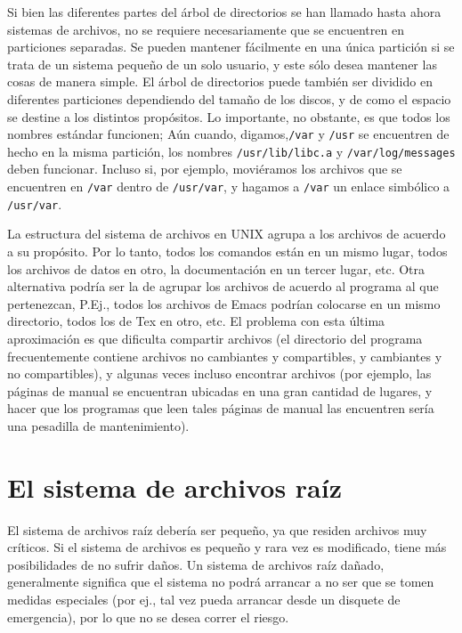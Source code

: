 Si bien las diferentes partes del árbol de directorios se han
llamado hasta ahora sistemas de archivos, no se requiere necesariamente que se
encuentren en particiones separadas. Se pueden mantener fácilmente en una única
partición si se trata de un sistema pequeño de un solo usuario, y este sólo
desea mantener las cosas de manera simple. El árbol de directorios puede también
ser dividido en  diferentes particiones dependiendo del tamaño de los discos, y
de como el espacio se destine a los distintos propósitos. Lo importante, no
obstante, es que todos los nombres estándar funcionen; Aún cuando,
digamos,\texttt{/var} y \texttt{/usr} se encuentren de
hecho en la misma partición, los nombres \texttt{/usr/lib/libc.a} y
\texttt{/var/log/messages} deben funcionar. Incluso si, por ejemplo,
moviéramos los archivos que se encuentren en \texttt{/var} dentro de
\texttt{/usr/var}, y hagamos a \texttt{/var} un enlace
simbólico a \texttt{/usr/var}.

 La estructura del sistema de archivos en UNIX agrupa a los archivos de
acuerdo a su propósito. Por lo tanto, todos los comandos están en un mismo
lugar, todos los archivos de datos en otro, la documentación en un tercer lugar,
etc.  Otra alternativa podría ser la de agrupar los archivos de acuerdo al
programa al que pertenezcan, P.Ej., todos los archivos de Emacs podrían
colocarse en un mismo directorio, todos los de Tex en otro, etc. El problema con
esta última aproximación es que dificulta compartir archivos (el directorio del
programa frecuentemente contiene archivos no cambiantes y compartibles, y
cambiantes y no compartibles), y algunas veces incluso encontrar archivos (por
ejemplo, las páginas de manual se encuentran ubicadas en una gran cantidad de
lugares, y hacer que los programas que leen tales páginas de manual las
encuentren sería una pesadilla de mantenimiento).  




\section{ El sistema de archivos raíz}

 El sistema de archivos raíz debería ser pequeño, ya que residen archivos
muy críticos. Si el sistema de archivos es pequeño y rara vez es modificado,
tiene más posibilidades de no sufrir daños. Un sistema de archivos raíz dañado,
generalmente significa que el sistema no podrá arrancar a no ser que se tomen
medidas especiales (por ej., tal vez pueda arrancar desde un disquete de
emergencia), por lo que no se desea correr el riesgo.  


